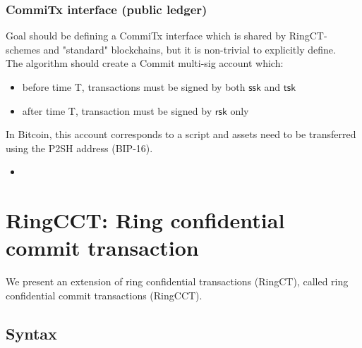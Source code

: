 \documentclass{article}      	%
\begin{document}
\subsubsection{CommiTx interface (public ledger)}
\begin{todobox}
Goal should be defining a CommiTx interface which is shared by RingCT-schemes and "standard" blockchains, but it is non-trivial to explicitly define. \\
The algorithm should create a Commit multi-sig account which:
\begin{itemize}
\item before time T, transactions must be signed by both $\mathsf{ssk}$ and $\mathsf{tsk}$
\item after time T, transaction must be signed by $\mathsf{rsk}$ only
\end{itemize}
In Bitcoin, this account corresponds to a script and assets need to be transferred using the P2SH address (BIP-16).
\end{todobox}


\begin{itemize}[topsep=0pt, itemsep=0pt, leftmargin=2em]
	\item %
\end{itemize}


\section{RingCCT: Ring confidential commit transaction}
We present an extension of ring confidential transactions (RingCT), called ring confidential commit transactions (RingCCT).

\subsection{Syntax}
\end{document}
